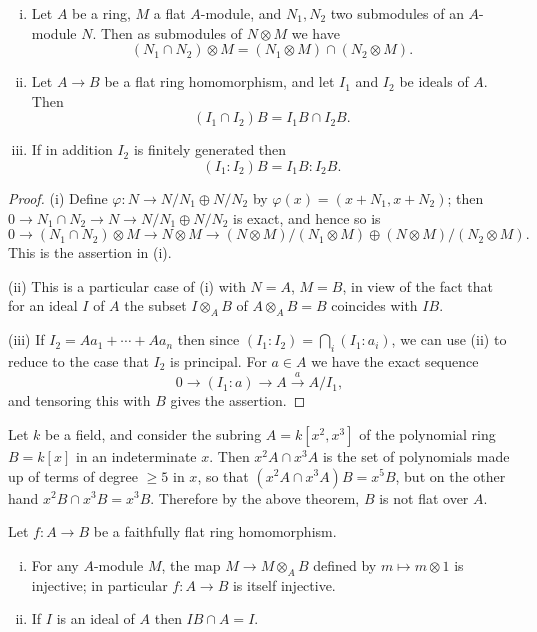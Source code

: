 \begin{theorem}\label{thm:7.4}
\begin{enumerate}[(i)]
  \item Let $A$ be a ring, $M$ a flat $A$-module, and $N_1, N_2$ two submodules of an
        $A$-module $N$. Then as submodules of $N \otimes M$ we have
        \[
          (N_1 \cap N_2) \otimes M = (N_1 \otimes M) \cap (N_2 \otimes M).
        \]
  \item Let $A \to B$ be a flat ring homomorphism, and let $I_1$ and $I_2$ be
        ideals of $A$. Then
        \[
          (I_1 \cap I_2)B = I_1B \cap I_2B.
        \]
  \item If in addition $I_2$ is finitely generated then
        \[
          (I_1:I_2)B = I_1B:I_2B.
        \]
\end{enumerate}
\end{theorem}

\begin{proof}
(i) Define $\varphi\colon N \to N/N_1 \oplus N/N_2$ by $\varphi(x) = (x + N_1, x + N_2)$; then
$0 \to N_1 \cap N_2 \to N \to N/N_1 \oplus N/N_2$ is exact, and hence so is
\[
  0 \to (N_1 \cap N_2) \otimes M \to N \otimes M \to
      (N \otimes M)/(N_1 \otimes M) \oplus (N \otimes M)/(N_2 \otimes M).
\]
This is the assertion in (i).

(ii) This is a particular case of (i) with $N = A$, $M = B$, in view of the fact
that for an ideal $I$ of $A$ the subset $I \otimes_A B$ of $A \otimes_A B = B$ coincides with $IB$.

(iii) If $I_2 = Aa_1 + \cdots + Aa_n$ then since $(I_1:I_2) = \bigcap_i (I_1:a_i)$, we can use
(ii) to reduce to the case that $I_2$ is principal. For $a \in A$ we have the exact
sequence
\[
  0 \to (I_1:a) \to A \xrightarrow{a} A/I_1,
\]
and tensoring this with $B$ gives the assertion.
\end{proof}

\begin{example*}
Let $k$ be a field, and consider the subring $A = k[x^2, x^3]$ of the
polynomial ring $B = k[x]$ in an indeterminate $x$. Then $x^2A \cap x^3A$ is the set
of polynomials made up of terms of degree $\ge 5$ in $x$, so that $(x^2A \cap x^3A)B
= x^5B$, but on the other hand $x^2B \cap x^3B = x^3B$. Therefore by the above
theorem, $B$ is not flat over $A$.
\end{example*}

\begin{theorem}\label{thm:7.5}
Let $f\colon A \to B$ be a faithfully flat ring homomorphism.
\begin{enumerate}[(i)]
  \item For any $A$-module $M$, the map $M \to M \otimes_A B$ defined by $m \mapsto m \otimes 1$
        is injective; in particular $f\colon A \to B$ is itself injective.
  \item If $I$ is an ideal of $A$ then $IB \cap A = I$.
\end{enumerate}
\end{theorem}

